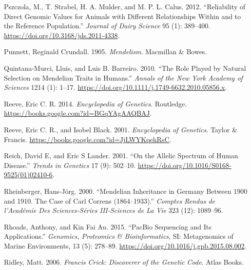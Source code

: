 \documentclass[
]{book}
\newlength{\cslhangindent}
\newlength{\cslentryspacingunit} %
\newenvironment{CSLReferences}[2] %
 {%
  \setlength{\parindent}{0pt}
  \ifodd #1
  \let\oldpar\par
  \def\par{\hangindent=\cslhangindent\oldpar}
  \fi
  \setlength{\parskip}{#2\cslentryspacingunit}
 }%
 {}
\begin{document}
\begin{CSLReferences}{1}{0}
\leavevmode{}%
Pszczola, M., T. Strabel, H. A. Mulder, and M. P. L. Calus. 2012. {``Reliability of Direct Genomic Values for Animals with Different Relationships Within and to the Reference Population.''} \emph{Journal of Dairy Science} 95 (1): 389--400. \url{https://doi.org/10.3168/jds.2011-4338}.

\leavevmode{}%
Punnett, Reginald Crundall. 1905. \emph{Mendelism}. {Macmillan \& Bowes}.

\leavevmode{}%
Quintana-Murci, Lluis, and Luis B. Barreiro. 2010. {``The Role Played by Natural Selection on {Mendelian} Traits in Humans.''} \emph{Annals of the New York Academy of Sciences} 1214 (1): 1--17. \url{https://doi.org/10.1111/j.1749-6632.2010.05856.x}.

\leavevmode{}%
Reeve, Eric C. R. 2014. \emph{Encyclopedia of {Genetics}}. {Routledge}. \url{https://books.google.com?id=BGqYAgAAQBAJ}.

\leavevmode{}%
Reeve, Eric C. R., and Isobel Black. 2001. \emph{Encyclopedia of {Genetics}}. {Taylor \& Francis}. \url{https://books.google.com?id=JjLWYKqehRsC}.

\leavevmode{}%
Reich, David E, and Eric S Lander. 2001. {``On the Allelic Spectrum of Human Disease.''} \emph{Trends in Genetics} 17 (9): 502--10. \url{https://doi.org/10.1016/S0168-9525(01)02410-6}.

\leavevmode{}%
Rheinberger, Hans-Jörg. 2000. {``Mendelian Inheritance in {Germany} Between 1900 and 1910. {The} Case of {Carl Correns} (1864--1933).''} \emph{Comptes Rendus de l'Académie Des Sciences-Séries III-Sciences de La Vie} 323 (12): 1089--96.

\leavevmode{}%
Rhoads, Anthony, and Kin Fai Au. 2015. {``{PacBio Sequencing} and {Its Applications}.''} \emph{Genomics, Proteomics \& Bioinformatics}, {SI}: {Metagenomics} of {Marine Environments}, 13 (5): 278--89. \url{https://doi.org/10.1016/j.gpb.2015.08.002}.

\leavevmode{}%
Ridley, Matt. 2006. \emph{Francis {Crick}: Discoverer of the Genetic Code}. {Atlas Books}.


\end{CSLReferences}
\end{document}
